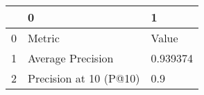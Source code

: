 \begin{tabular}{lll}
\toprule
{} &                       0 &         1 \\
\midrule
0 &                  Metric &     Value \\
1 &       Average Precision &  0.939374 \\
2 &  Precision at 10 (P@10) &       0.9 \\
\bottomrule
\end{tabular}
